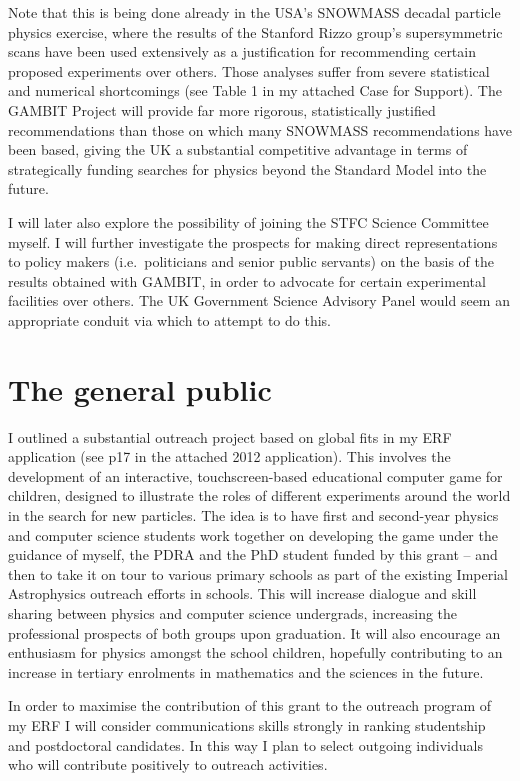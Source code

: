 \documentclass[11pt,oneside,onecolumn,a4paper]{article}
\begin{document}
Note that this is being done already in the USA's SNOWMASS decadal particle physics exercise, where the results of the Stanford Rizzo group's supersymmetric scans have been used extensively as a justification for recommending certain proposed experiments over others.  Those analyses suffer from severe statistical and numerical shortcomings (see Table 1 in my attached Case for Support).  The GAMBIT Project will provide far more rigorous, statistically justified recommendations than those on which many SNOWMASS recommendations have been based, giving the UK a substantial competitive advantage in terms of strategically funding searches for physics beyond the Standard Model into the future.

I will later also explore the possibility of joining the STFC Science Committee myself.  I will further investigate the prospects for making direct representations to policy makers (i.e.\ politicians and senior public servants) on the basis of the results obtained with GAMBIT, in order to advocate for certain experimental facilities over others.  The UK Government Science Advisory Panel would seem an appropriate conduit via which to attempt to do this.

\section{The general public}
I outlined a substantial outreach project based on global fits in my ERF application (see p17 in the attached 2012 application).  This involves the development of an interactive, touchscreen-based educational computer game for children, designed to illustrate the roles of different experiments around the world in the search for new particles.  The idea is to have first and second-year physics and computer science students work together on developing the game under the guidance of myself, the PDRA and the PhD student funded by this grant -- and then to take it on tour to various primary schools as part of the existing Imperial Astrophysics outreach efforts in schools.  This will increase dialogue and skill sharing between physics and computer science undergrads, increasing the professional prospects of both groups upon graduation.  It will also encourage an enthusiasm for physics amongst the school children, hopefully contributing to an increase in tertiary enrolments in mathematics and the sciences in the future.

In order to maximise the contribution of this grant to the outreach program of my ERF I will consider communications skills strongly in ranking studentship and postdoctoral candidates.  In this way I plan to select outgoing individuals who will contribute positively to outreach activities.
\end{document}
